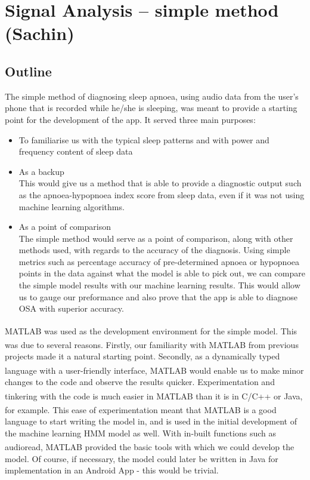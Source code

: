 \section{Signal Analysis -- simple method (Sachin)}
\label{sec:simple-sachin}

\subsection{Outline}

The simple method of diagnosing sleep apnoea, using audio data from the user's phone that is recorded while he/she is sleeping, was meant to provide a starting point for the development of the app. It served three main purposes:

\begin{itemize}
\item To familiarise us with the typical sleep patterns and with power and frequency content of sleep data
\item As a backup\\
This would give us a method that is able to provide a diagnostic output such as the apnoea-hypopnoea index score from sleep data, even if it was not using machine learning algorithms. 
\item As a point of comparison\\
The simple method would serve as a point of comparison, along with other methods used, with regards to the accuracy of the diagnosis. Using simple metrics such as percentage accuracy of pre-determined apnoea or hypopnoea points in the data against what the model is able to pick out, we can compare the simple model results with our machine learning results. This would allow us to gauge our preformance and also prove that the app is able to diagnose OSA with superior accuracy.
\end{itemize}

MATLAB\textsuperscript{\textregistered{}} was used as the development environment for the simple model. This was due to several reasons. Firstly, our familiarity with MATLAB\textsuperscript{\textregistered{}} from previous projects made it a natural starting point. Secondly, as a dynamically typed language with a user-friendly interface, MATLAB\textsuperscript{\textregistered{}} would enable us to make minor changes to the code and observe the results quicker. Experimentation and tinkering with the code is much easier in MATLAB\textsuperscript{\textregistered{}}  than it is in C/C++ or Java, for example. This ease of experimentation meant that MATLAB\textsuperscript{\textregistered{}} is a good language to start writing the model in, and is used in the initial development of the machine learning HMM model as well. With in-built functions such as audioread, MATLAB\textsuperscript{\textregistered{}}  provided the basic tools with which we could develop the model. Of course, if necessary, the model could later be written in Java for implementation in an Android App - this would be trivial.

